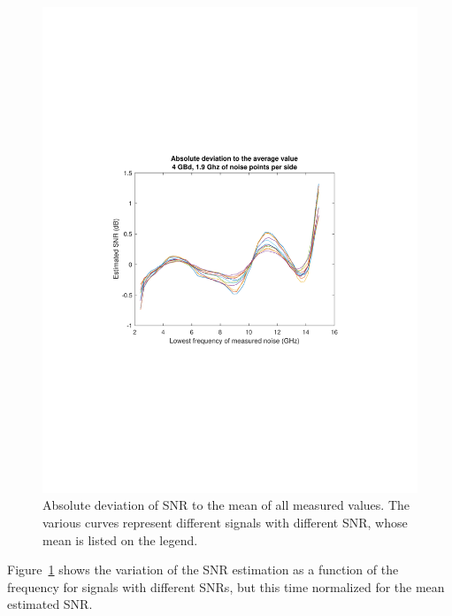 \begin{refsection}
\begin{figure}[H]
\begin{minipage}{0.43\textwidth}
		\includegraphics[clip, trim=4cm 8cm 4cm 8cm, 
		width=1\textwidth]{./sdf/m_qam_system/figures/snr/absDev/4GBSNRAbsDev.pdf}
		\subcaption{\label{fig:snrAbsDev_4_2500}}
	\end{minipage}
	\caption{Absolute deviation of SNR to the mean of all measured values. The various curves represent different signals with different SNR, whose mean is listed on the legend.\label{fig:absDev_16_tri30}}
\end{figure}

Figure~\ref{fig:absDev_16_tri30} shows the variation of the SNR 
estimation as a function of the frequency for 
signals with different SNRs, but this time normalized for the mean estimated 
SNR.


\end{refsection}
